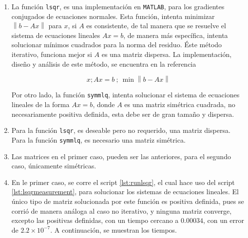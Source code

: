 \documentclass[11pt, spanish]{article}
\newcommand{\norm}[1]{\left\lVert#1\right\rVert}
\begin{document}
\begin{enumerate}

\item La función \texttt{lsqr}, es una implementación en \texttt{MATLAB}, para los gradientes conjugados de ecuaciones normales. Esta función, intenta minimizar $\norm{b - Ax}$ para $x$, si $A$ es consistente, de tal manera que se resuelve el sistema de ecuaciones lineales $Ax = b$, de manera más específica, intenta solucionar mínimos cuadrados para la norma del residuo. Éste método iterativo, funciona mejor si $A$ es una matriz dispersa. La implementación, diseño y análisis de este método, se encuentra en la referencia \cite{Paige:1982:LAS:355984.355989}

$$x; Ax = b\ ;\ \min \norm{b - Ax}$$

Por otro lado, la función \texttt{symmlq}, intenta solucionar el sistema de ecuaciones lineales de la forma $Ax = b$, donde $A$ es una matriz simétrica cuadrada, no necesariamente positiva definida, esta debe ser de gran tamaño y dispersa.

\item Para la función \texttt{lsqr}, es deseable pero no requerido, una matriz dispersa. Para la función \texttt{symmlq}, es necesario una matriz simétrica.

\item Las matrices en el primer caso, pueden ser las anteriores, para el segundo caso, únicamente simétricas.

\item En le primer caso, se corre el script \ref{lst:runlsqr}, el cual hace uso del script \ref{lst:lsqrmeasurement}, para solucionar los sistemas de ecuaciones lineales. El único tipo de matriz solucionada por este función es positiva definida, pues se corrió de manera análoga al caso no iterativo, y ninguna matriz converge, excepto las positivas definidas, con un tiempo cercano a $0.00034$, con un error de $2.2\times 10^{-7}$. A continuación, se muestran los tiempos.


\end{enumerate}
\end{document}
